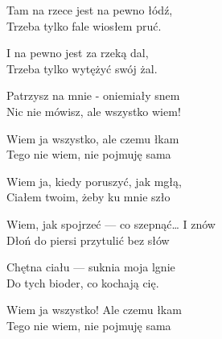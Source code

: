\begin{text}
    Tam na rzece jest na pewno łódź,\\
    Trzeba tylko fale wiosłem pruć.

    I na pewno jest za rzeką dal,\\
    Trzeba tylko wytężyć swój żal.

    Patrzysz na mnie - oniemiały snem\\
    Nic nie mówisz, ale wszystko wiem!

    Wiem ja wszystko, ale czemu łkam\\
    Tego nie wiem, nie pojmuję sama

    Wiem ja, kiedy poruszyć, jak mgłą,\\
    Ciałem twoim, żeby ku mnie szło

    Wiem, jak spojrzeć — co szepnąć… I znów\\
    Dłoń do piersi przytulić bez słów

    Chętna ciału — suknia moja lgnie\\
    Do tych bioder, co kochają cię.

    Wiem ja wszystko! Ale czemu łkam\\
    Tego nie wiem, nie pojmuję sama
\end{text}
\begin{chord}

\end{chord}